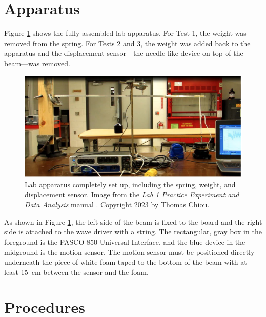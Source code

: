\documentclass[12 pt]{report}
\begin{document}
\section{Apparatus} \label{apparatus}
Figure \ref{fig:lab_apparatus} shows the fully assembled lab apparatus. For Test \num{1}, the weight was removed from the spring. For Tests \num{2} and \num{3}, the weight was added back to the apparatus and the displacement sensor---the needle-like device on top of the beam---was removed.

\begin{figure}[htbp]
\centering
\includegraphics[width=6in]{images/Lab_Apparatus}
\caption{Lab apparatus completely set up, including the spring, weight, and displacement sensor. Image from the \textit{Lab 1 Practice Experiment and Data Analysis} manual \cite{lab_procedures}. Copyright 2023 by Thomas Chiou.}
\label{fig:lab_apparatus}
\end{figure}

As shown in Figure \ref{fig:lab_apparatus}, the left side of the beam is fixed to the board and the right side is attached to the wave driver with a string. The rectangular, gray box in the foreground is the PASCO 850 Universal Interface, and the blue device in the midground is the motion sensor. The motion sensor must be positioned directly underneath the piece of white foam taped to the bottom of the beam with at least \qty{15}{\cm} between the sensor and the foam.

\section{Procedures} \label{procedures}
\end{document}
